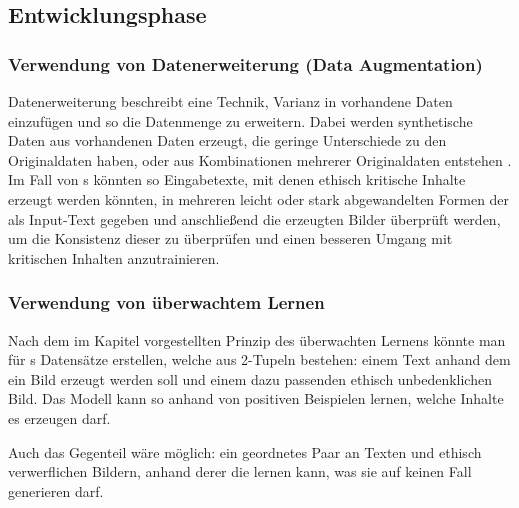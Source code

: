 \documentclass[12pt]{report}
\begin{document}
\subsection{Entwicklungsphase}

\subsubsection{Verwendung von Datenerweiterung (Data Augmentation)}
Datenerweiterung beschreibt eine Technik, Varianz in vorhandene Daten einzufügen und so die Datenmenge zu erweitern. Dabei werden synthetische Daten aus vorhandenen Daten erzeugt, die geringe Unterschiede zu den Originaldaten haben, oder aus Kombinationen mehrerer Originaldaten entstehen \cite[S. 2]{Shorten}. %
Im Fall von s könnten so Eingabetexte, mit denen ethisch kritische Inhalte erzeugt werden könnten, in mehreren leicht oder stark abgewandelten Formen der  als Input-Text 
gegeben und anschließend die erzeugten Bilder überprüft werden, um die Konsistenz dieser zu überprüfen und einen besseren Umgang mit kritischen Inhalten anzutrainieren.  

\subsubsection{Verwendung von überwachtem Lernen}\label{Supervised Learning}
Nach dem im Kapitel  vorgestellten Prinzip des überwachten Lernens könnte man für s Datensätze erstellen, welche aus 2-Tupeln bestehen: einem Text anhand dem ein Bild erzeugt werden soll und einem dazu passenden ethisch unbedenklichen Bild. Das Modell kann so anhand von positiven Beispielen lernen, welche Inhalte es erzeugen darf.

Auch das Gegenteil wäre möglich: ein geordnetes Paar an Texten und ethisch verwerflichen Bildern, anhand derer die  lernen kann, was sie auf keinen Fall generieren darf.
\end{document}
